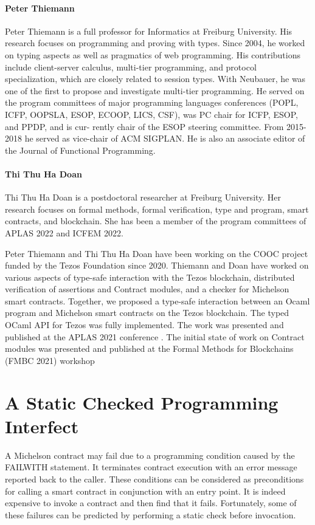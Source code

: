 \documentclass[a4paper,11pt]{article}
\begin{document}
\paragraph{Peter Thiemann}
Peter Thiemann is a full professor for Informatics at Freiburg University.
His research focuses on programming and proving with types. Since 2004, he worked on
typing aspects as well as pragmatics of web programming. His contributions include client-server calculus, multi-tier programming, and protocol specialization, which are closely related to session types. With Neubauer, he was one of the first to propose and investigate multi-tier
programming. He served on the program committees of major programming languages conferences (POPL,
ICFP, OOPSLA, ESOP, ECOOP, LICS, CSF), was PC chair for ICFP, ESOP, and PPDP, and is cur-
rently chair of the ESOP steering committee. From 2015-2018 he served as vice-chair of ACM
SIGPLAN. He is also an associate editor of the Journal of Functional Programming.


\paragraph{Thi Thu Ha Doan} Thi Thu Ha Doan is a postdoctoral researcher at Freiburg University. Her research focuses on formal methods, formal verification, type and program, smart contracts, and blockchain. She has been a member of the program committees of APLAS 2022 and ICFEM 2022. 

Peter Thiemann and Thi Thu Ha Doan have been working on the COOC project funded by the Tezos Foundation since 2020. Thiemann and Doan have worked on various aspects of type-safe interaction with the Tezos blockchain, distributed verification of assertions and Contract modules, and a checker for Michelson smart contracts. Together, we proposed a type-safe interaction between an Ocaml program and Michelson smart contracts on the Tezos blockchain. The typed OCaml API for Tezos was fully implemented. The work was presented and published at the APLAS 2021 conference \cite{DBLP:conf/fc/ThiemannAplas21}. The initial state of work on Contract modules was presented and published at the Formal Methods for Blockchains (FMBC 2021) workshop \cite{DBLP:conf/fc/ThiemannFmbc21}


\section{A Static Checked Programming Interfect}
\label{sec:checked-programming-interfect}
A Michelson contract may fail due to a programming condition caused by the FAILWITH statement. It terminates contract execution with an error message reported back to the caller. These conditions can be considered as preconditions for calling a smart contract in conjunction with an entry point. It is indeed expensive to invoke a contract and then find that it fails. Fortunately, some of these failures can be predicted by performing a static check before invocation.
\end{document}
